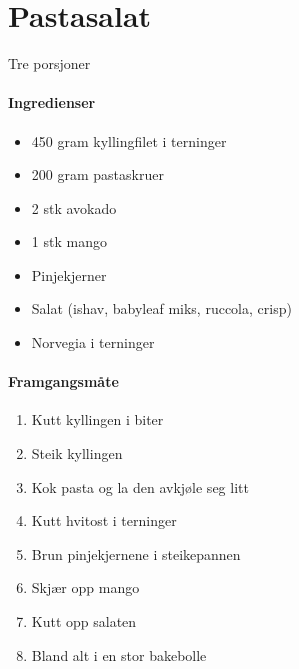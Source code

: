 \section{Pastasalat}
Tre porsjoner

\paragraph{Ingredienser}
\begin{itemize}[noitemsep]
	\item 450 gram kyllingfilet i terninger
	\item 200 gram pastaskruer
	\item 2 stk avokado
	\item 1 stk mango
	\item Pinjekjerner
	\item Salat (ishav, babyleaf miks, ruccola, crisp)
	\item Norvegia i terninger
\end{itemize}

\paragraph{Framgangsmåte}
\begin{enumerate}[noitemsep]
	\item Kutt kyllingen i biter
	\item Steik kyllingen
	\item Kok pasta og la den avkjøle seg litt
	\item Kutt hvitost i terninger
	\item Brun pinjekjernene i steikepannen
	\item Skjær opp mango
	\item Kutt opp salaten
	\item Bland alt i en stor bakebolle
\end{enumerate}
